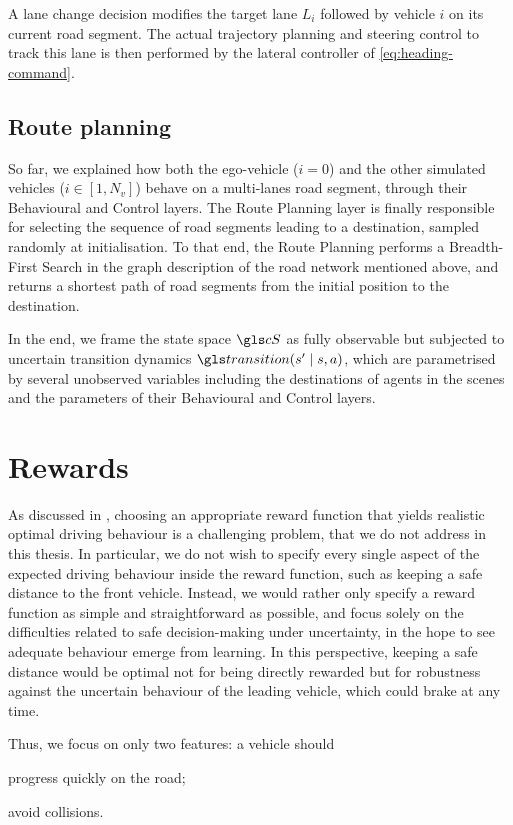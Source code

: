 A lane change decision modifies the target lane $L_i$ followed by vehicle $i$ on its current road segment. The actual trajectory planning and steering control to track this lane is then performed by the lateral controller of \eqref{eq:heading-command}.

\subsection{Route planning}

So far, we explained how both the ego-vehicle ($i=0$) and the other simulated vehicles ($i\in[1, N_v]$) behave on a multi-lanes road segment, through their Behavioural and Control layers. The Route Planning layer is finally responsible for selecting the sequence of road segments leading to a destination, sampled randomly at initialisation. To that end, the Route Planning performs a Breadth-First Search in the graph description of the road network mentioned above, and returns a shortest path of road segments from the initial position to the destination.

In the end, we frame the state space $\cS$ as fully observable but subjected to uncertain transition dynamics $\Ps\parentheses{s' \mid s, a}$, which are parametrised by several unobserved variables including the destinations of agents in the scenes and the parameters of their Behavioural and Control layers.

\section{Rewards}

As discussed in , choosing an appropriate reward function that yields realistic optimal driving behaviour is a challenging problem, that we do not address in this thesis. In particular, we do not wish to specify every single aspect of the expected driving behaviour inside the reward function, such as keeping a safe distance to the front vehicle. Instead, we would rather only specify a reward function as simple and straightforward as possible, and focus solely on the difficulties related to safe decision-making under uncertainty, in the hope to see adequate behaviour emerge from learning. In this perspective, keeping a safe distance would be optimal not for being directly rewarded but for robustness against the uncertain behaviour of the leading vehicle, which could brake at any time.

Thus, we focus on only two features: a vehicle should
\begin{enumerate*}[label=(\roman*)]
	\item progress quickly on the road;
	\item avoid collisions.
\end{enumerate*}

